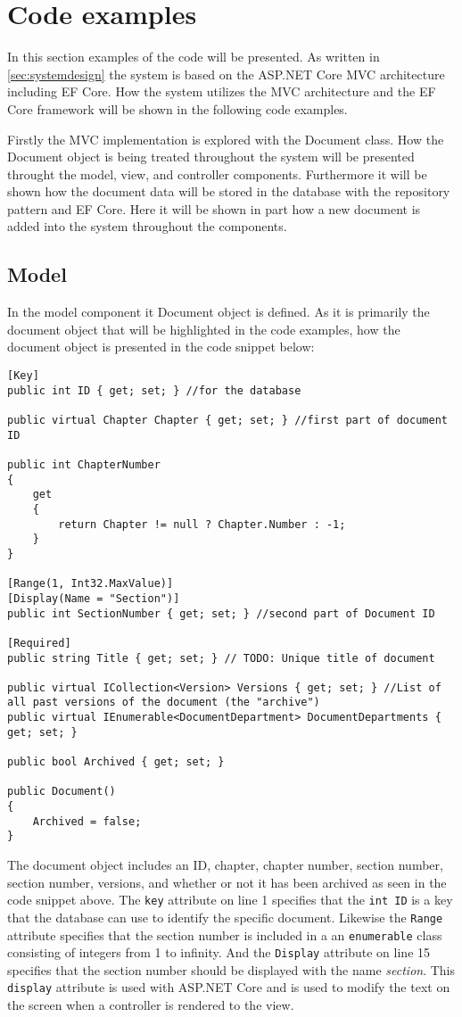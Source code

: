 \section{Code examples}
In this section examples of the code will be presented.
As written in \cref{sec:systemdesign} the system is based on the ASP.NET Core MVC architecture including EF Core.
How the system utilizes the MVC architecture and the EF Core framework will be shown in the following code examples.

Firstly the MVC implementation is explored with the Document class.
How the Document object is being treated throughout the system will be presented throught the model, view, and controller components.
Furthermore it will be shown how the document data will be stored in the database with the repository pattern and EF Core.
Here it will be shown in part how a new document is added into the system throughout the components.

\subsection{Model}

In the model component it Document object is defined.
As it is primarily the document object that will be highlighted in the code examples, how the document object is presented in the code snippet below:
\\
\begin{lstlisting}
[Key]
public int ID { get; set; } //for the database

public virtual Chapter Chapter { get; set; } //first part of document ID

public int ChapterNumber
{
	get
	{
		return Chapter != null ? Chapter.Number : -1;
	}
}

[Range(1, Int32.MaxValue)]
[Display(Name = "Section")]
public int SectionNumber { get; set; } //second part of Document ID

[Required]
public string Title { get; set; } // TODO: Unique title of document

public virtual ICollection<Version> Versions { get; set; } //List of all past versions of the document (the "archive")
public virtual IEnumerable<DocumentDepartment> DocumentDepartments { get; set; }

public bool Archived { get; set; }

public Document()
{
	Archived = false;
}
\end{lstlisting}

The document object includes an ID, chapter, chapter number, section number, section number, versions, and whether or not it has been archived as seen in the code snippet above.
The \texttt{key} attribute on line 1 specifies that the \texttt{int ID} is a key that the database can use to identify the specific document.
Likewise the \texttt{Range} attribute specifies that the section number is included in a an \texttt{enumerable} class consisting of integers from 1 to infinity.
And the \texttt{Display} attribute on line 15 specifies that the section number should be displayed with the name \textit{section}.
This \texttt{display} attribute is used with ASP.NET Core and is used to modify the text on the screen when a controller is rendered to the view.

